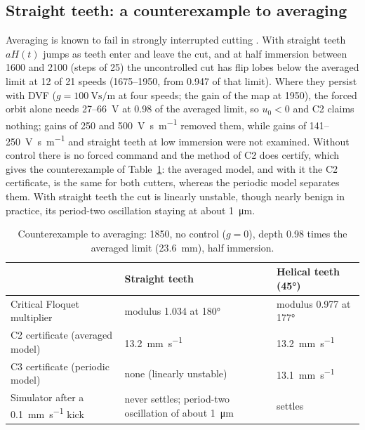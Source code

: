 \subsection{Straight teeth: a counterexample to averaging}\label{supp:cert-straight}

Averaging is known to fail in strongly interrupted cutting \citep{davies2002stability,bayly2003stability,merdol2004multi}. With straight teeth $aH(t)$ jumps as teeth enter and leave the cut, and at half immersion between 1600 and \SI{2100}{\rpm} (steps of \SI{25}{\rpm}) the uncontrolled cut has flip lobes below the averaged limit at 12 of 21 speeds (1675--\SI{1950}{\rpm}, from 0.947 of that limit). Where they persist with DVF ($g=\SI{100}{\volt\second\per\metre}$ at four speeds; the gain of the map at \SI{1950}{\rpm}), the forced orbit alone needs 27--\SI{66}{\volt} at 0.98 of the averaged limit, so $u_0<0$ and C2 claims nothing; gains of 250 and \SI{500}{\volt\second\per\metre} removed them, while gains of 141--\SI{250}{\volt\second\per\metre} and straight teeth at low immersion were not examined. Without control there is no forced command and the method of C2 does certify, which gives the counterexample of Table~\ref{tab:counter}: the averaged model, and with it the C2 certificate, is the same for both cutters, whereas the periodic model separates them. With straight teeth the cut is linearly unstable, though nearly benign in practice, its period-two oscillation staying at about \SI{1}{\micro\metre}.

\begin{table}[!tbp]
\centering
\caption{Counterexample to averaging: \SI{1850}{\rpm}, no control ($g=0$), depth 0.98 times the averaged limit (\SI{23.6}{\milli\metre}), half immersion.}
\label{tab:counter}
\small
\begin{tabular}{@{}>{\raggedright\arraybackslash}p{}>{\raggedright\arraybackslash}p{}>{\raggedright\arraybackslash}p{}@{}}
\toprule
 & Straight teeth & Helical teeth (\ang{45})\\
\midrule
Critical Floquet multiplier & modulus 1.034 at \ang{180} & modulus 0.977 at \ang{177}\\
C2 certificate (averaged model) & \SI{13.2}{\milli\metre\per\second} & \SI{13.2}{\milli\metre\per\second}\\
C3 certificate (periodic model) & none (linearly unstable) & \SI{13.1}{\milli\metre\per\second}\\
Simulator after a \SI{0.1}{\milli\metre\per\second} kick & never settles; period-two oscillation of about \SI{1}{\micro\metre} & settles\\
\bottomrule
\end{tabular}
\end{table}
